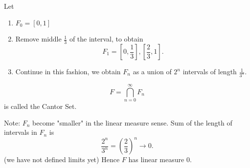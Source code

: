 
\begin{definition}
	Let
	\begin{enumerate}
		\item $F_0 = [0,1]$
		\item Remove middle  $\frac{1}{3}$ of the interval, to obtain \[
			F_1 = [0,\frac{1}{3}], [\frac{2}{3}, 1]
		.\] 
	\item Continue in this fashion, we obtain $F_n$ as a union of $2^n$ intervals of length $\frac{1}{3^n}$.
	\end{enumerate}
	\[
	F = \bigcap_{n = 0} ^\infty  F_n
	\] 
	is called the Cantor Set.
\end{definition}

Note: $F_n$ become "smaller" in the linear measure sense. Sum of the length of intervals in $F_n$ is \[
\frac{2^n}{3^n} = (\frac{2}{3})^n \to 0
.\] (we have not defined limits yet) Hence $F$ has linear measure 0.


